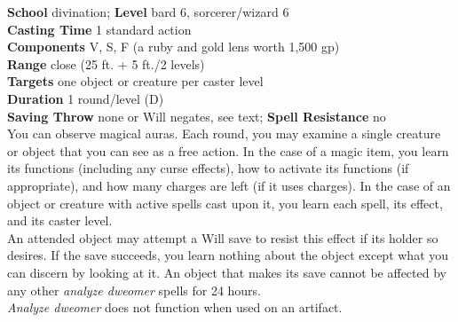 \textbf{School} divination; \textbf{Level} bard 6, sorcerer/wizard 6\\
\textbf{Casting Time} 1 standard action\\
\textbf{Components} V, S, F (a ruby and gold lens worth 1,500 gp)\\
\textbf{Range} close (25 ft. + 5 ft./2 levels)\\
\textbf{Targets} one object or creature per caster level\\
\textbf{Duration} 1 round/level (D)\\
\textbf{Saving Throw} none or Will negates, see text; \textbf{Spell Resistance} no\\
You can observe magical auras. Each round, you may examine a single creature or object that you can see as a free action. In the case of a magic item, you learn its functions (including any curse effects), how to activate its functions (if appropriate), and how many charges are left (if it uses charges). In the case of an object or creature with active spells cast upon it, you learn each spell, its effect, and its caster level.\\
An attended object may attempt a Will save to resist this effect if its holder so desires. If the save succeeds, you learn nothing about the object except what you can discern by looking at it. An object that makes its save cannot be affected by any other \textit{analyze dweomer }spells for 24 hours.\\
\textit{Analyze dweomer }does not function when used on an artifact.\\
